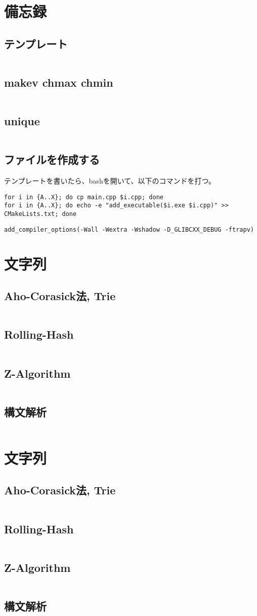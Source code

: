 \documentclass[twocolumn, autodetect-engine, 8pt]{jarticle}
\newcommand{\mycode}[2]{
\subsection{#1}
\inputminted[fontfamily=courier, breaklines, breakanywhere, mathescape, fontsize=\footnotesize]{cpp}{../_includes/code/#2}}
\begin{document}
\tableofcontents
\newpage
\section{備忘録}

\mycode{テンプレート}{template.cpp}
\mycode{makev chmax chmin}{makev.cpp}
\mycode{unique}{uniq.cpp}
\subsection{ファイルを作成する}
テンプレートを書いたら、bashを開いて、以下のコマンドを打つ。
\begin{verbatim}
for i in {A..X}; do cp main.cpp $i.cpp; done
for i in {A..X}; do echo -e "add_executable($i.exe $i.cpp)" >> CMakeLists.txt; done
\end{verbatim}

\begin{verbatim}
add_compiler_options(-Wall -Wextra -Wshadow -D_GLIBCXX_DEBUG -ftrapv)
\end{verbatim}
\newpage
\section{文字列}
\mycode{Aho-Corasick法, Trie}{ahocorasick.cpp}
\mycode{Rolling-Hash}{rolling_hash.cpp}
\mycode{Z-Algorithm}{parse.cpp}
\mycode{構文解析}{z-algorithm.cpp}
\section{文字列}
\mycode{Aho-Corasick法, Trie}{ahocorasick.cpp}
\mycode{Rolling-Hash}{rolling_hash.cpp}
\mycode{Z-Algorithm}{z-algorithm.cpp}
\mycode{構文解析}{parse.cpp}
\newpage
\end{document}
